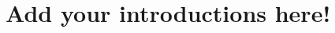 \chapter{Add your introductions here!}
\hypertarget{md__datos_2articles_2intro}{}\label{md__datos_2articles_2intro}
\label{md__datos_2articles_2intro_autotoc_md1}%
%
